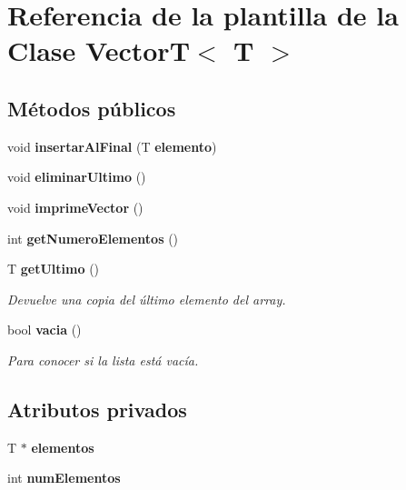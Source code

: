 \section{Referencia de la plantilla de la Clase Vector\-T$<$ T $>$}
\label{classVectorT}
\subsection*{Métodos públicos}
\begin{DoxyCompactItemize}
\item 
void {\bfseries insertar\-Al\-Final} (T {\bf elemento})\label{classVectorT_ac46997b2a4f8918eeedaa7ea7e50761b}

\item 
void {\bfseries eliminar\-Ultimo} ()\label{classVectorT_a50a0ca76f17b1b9e0fcb37aee8c7a46b}

\item 
void {\bfseries imprime\-Vector} ()\label{classVectorT_a1c27228cd7176d5e55eab53ded231793}

\item 
int {\bfseries get\-Numero\-Elementos} ()\label{classVectorT_ae0fe8836f4ddfc936f32e41da7135293}

\item 
T {\bf get\-Ultimo} ()
\begin{DoxyCompactList}\small\item\em Devuelve una copia del último elemento del array. \end{DoxyCompactList}\item 
bool {\bf vacia} ()
\begin{DoxyCompactList}\small\item\em Para conocer si la lista está vacía. \end{DoxyCompactList}\end{DoxyCompactItemize}
\subsection*{Atributos privados}
\begin{DoxyCompactItemize}
\item 
T $\ast$ {\bfseries elementos}\label{classVectorT_af7f7b04459c7571e1711dd87b0e60f23}

\item 
int {\bfseries num\-Elementos}\label{classVectorT_afa81bf414123fece36d0ed8f1c4d9a46}

\end{DoxyCompactItemize}


